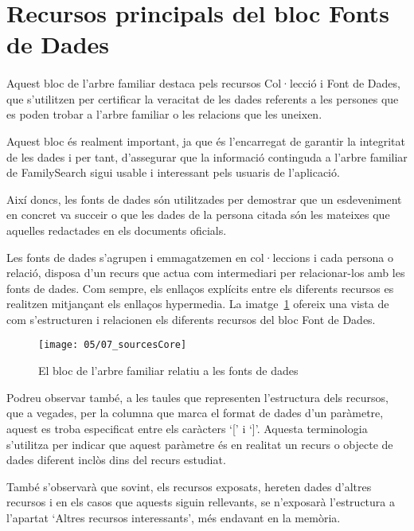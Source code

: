 \section{Recursos principals del bloc Fonts de Dades}

    \paragraph{}
    Aquest bloc de l'arbre familiar destaca pels recursos Col·lecció i Font de Dades, que s'utilitzen per certificar la veracitat de les dades referents a les persones que es poden trobar a l'arbre familiar o les relacions que les uneixen.

    Aquest bloc és realment important, ja que és l'encarregat de garantir la integritat de les dades i per tant, d'assegurar que la informació continguda a l'arbre familiar de FamilySearch sigui usable i interessant pels usuaris de l'aplicació.

    Així doncs, les fonts de dades són utilitzades per demostrar que un esdeveniment en concret va succeir o que les dades de la persona citada són les mateixes que aquelles redactades en els documents oficials.

    Les fonts de dades s'agrupen i emmagatzemen en col·leccions i cada persona o relació, disposa d'un recurs que actua com intermediari per relacionar-los amb les fonts de dades. Com sempre, els enllaços explícits entre els diferents recursos es realitzen mitjançant els enllaços hypermedia. La imatge~\ref{img:sourcesBloc} ofereix una vista de com s'estructuren i relacionen els diferents recursos del bloc Font de Dades.

    \begin{figure}[h]
        \texttt{[image: 05/07\_sourcesCore]}
        \centering
        \caption{El bloc de l'arbre familiar relatiu a les fonts de dades}\label{img:sourcesBloc}
    \end{figure}

    Podreu observar també, a les taules que representen l'estructura dels recursos, que a vegades, per la columna que marca el format de dades d'un paràmetre, aquest es troba especificat entre els caràcters `[' i `]'. Aquesta terminologia s'utilitza per indicar que aquest paràmetre és en realitat un recurs o objecte de dades diferent inclòs dins del recurs estudiat.

    També s'observarà que sovint, els recursos exposats, hereten dades d'altres recursos i en els casos que aquests siguin rellevants, se n'exposarà l'estructura a l'apartat `Altres recursos interessants', més endavant en la memòria.

    
    
    
    
    
